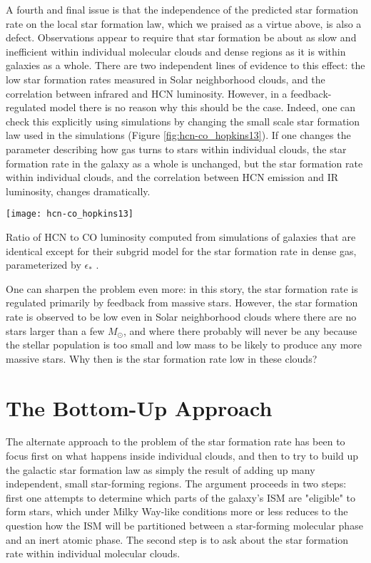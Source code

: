 A fourth and final issue is that the independence of the predicted star formation rate on the local star formation law, which we praised as a virtue above, is also a defect. Observations appear to require that star formation be about as slow and inefficient within individual molecular clouds and dense regions as it is within galaxies as a whole. There are two independent lines of evidence to this effect: the low star formation rates measured in Solar neighborhood clouds, and the correlation between infrared and HCN luminosity. However, in a feedback-regulated model there is no reason why this should be the case. Indeed, one can check this explicitly using simulations by changing the small scale star formation law used in the simulations (Figure \ref{fig:hcn-co_hopkins13}). If one changes the parameter describing how gas turns to stars within individual clouds, the star formation rate in the galaxy as a whole is unchanged, but the star formation rate within individual clouds, and the correlation between HCN emission and IR luminosity, changes dramatically.

\begin{marginfigure}
\texttt{[image: hcn-co\_hopkins13]}
\caption[Ratio of HCN to CO luminosity as a function of subgrid star formation recipe]{
\label{fig:hcn-co_hopkins13}
Ratio of HCN to CO luminosity computed from simulations of galaxies that are identical except for their subgrid model for the star formation rate in dense gas, parameterized by $\epsilon_*$ \citet{hopkins13c}.
}
\end{marginfigure}

One can sharpen the problem even more: in this story, the star formation rate is regulated primarily by feedback from massive stars. However, the star formation rate is observed to be low even in Solar neighborhood clouds where there are no stars larger than a few $M_\odot$, and where there probably will never be any because the stellar population is too small and low mass to be likely to produce any more massive stars. Why then is the star formation rate low in these clouds?

\section{The Bottom-Up Approach}

The alternate approach to the problem of the star formation rate has been to focus first on what happens inside individual clouds, and then to try to build up the galactic star formation law as simply the result of adding up many independent, small star-forming regions. The argument proceeds in two steps: first one attempts to determine which parts of the galaxy's ISM are "eligible" to form stars, which under Milky Way-like conditions more or less reduces to the question how the ISM will be partitioned between a star-forming molecular phase and an inert atomic phase. The second step is to ask about the star formation rate within individual molecular clouds.

